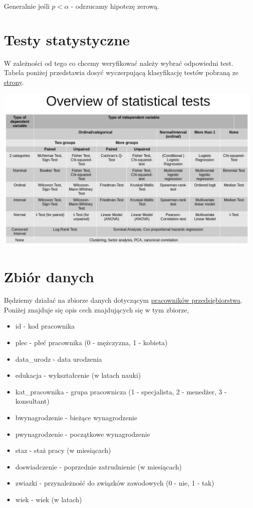 \documentclass[
]{book}
\providecommand{\tightlist}{%
  \setlength{\itemsep}{0pt}\setlength{\parskip}{0pt}}
\begin{document}
Generalnie jeśli \(p < \alpha\) - odrzucamy hipotezę zerową.

\hypertarget{testy-statystyczne}{%
\section{Testy statystyczne}\label{testy-statystyczne}}

W zależności od tego co chcemy weryfikować należy wybrać odpowiedni test. Tabela poniżej przedstawia dosyć wyczerpującą klasyfikację testów pobraną ze \href{https://philipppro.github.io/Statistical_tests_overview/}{strony}.

\includegraphics{img/tests.png}

\hypertarget{zbiuxf3r-danych}{%
\section{Zbiór danych}\label{zbiuxf3r-danych}}

Będziemy działać na zbiorze danych dotyczącym \href{data/pracownicy.xlsx}{pracowników przedsiębiorstwa}. Poniżej znajduje się opis cech znajdujących się w tym zbiorze,

\begin{itemize}
\tightlist
\item
  id - kod pracownika
\item
  plec - płeć pracownika (0 - mężczyzna, 1 - kobieta)
\item
  data\_urodz - data urodzenia
\item
  edukacja - wykształcenie (w latach nauki)
\item
  kat\_pracownika - grupa pracownicza (1 - specjalista, 2 - menedżer, 3 - konsultant)
\item
  bwynagrodzenie - bieżące wynagrodzenie
\item
  pwynagrodzenie - początkowe wynagrodzenie
\item
  staz - staż pracy (w miesiącach)
\item
  doswiadczenie - poprzednie zatrudnienie (w miesiącach)
\item
  zwiazki - przynależność do związków zawodowych (0 - nie, 1 - tak)
\item
  wiek - wiek (w latach)
\end{itemize}
\end{document}
